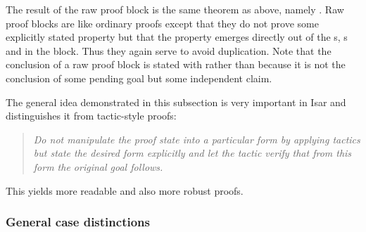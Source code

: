 \begin{isabellebody}
\begin{isamarkuptext}
\noindent The result of the raw proof block is the same theorem
as above, namely .  Raw
proof blocks are like ordinary proofs except that they do not prove
some explicitly stated property but that the property emerges directly
out of the s, s and
 in the block. Thus they again serve to avoid
duplication. Note that the conclusion of a raw proof block is stated with
 rather than  because it is not the
conclusion of some pending goal but some independent claim.

The general idea demonstrated in this subsection is very
important in Isar and distinguishes it from tactic-style proofs:
\begin{quote}\em
Do not manipulate the proof state into a particular form by applying
tactics but state the desired form explicitly and let the tactic verify
that from this form the original goal follows.
\end{quote}
This yields more readable and also more robust proofs.

\subsubsection{General case distinctions}


\end{isamarkuptext}
\end{isabellebody}
